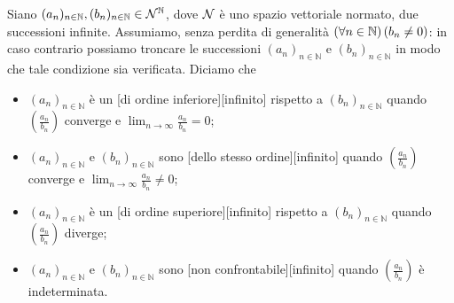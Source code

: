 \begin{Definition}
	Siano $(a_n)_{n \in \mathbb{N}}, (b_n)_{n \in \mathbb{N}} \in \mathcal{N}^\mathbb{N}$, dove $\mathcal{N}$ \`e uno spazio vettoriale normato, due successioni infinite. Assumiamo, senza perdita di generalit\`a $\left ( \forall n \in \mathbb{N} \right ) \left ( b_n \neq 0 \right )$: in caso contrario possiamo troncare le successioni $(a_n)_{n \in \mathbb{N}}$ e $(b_n)_{n \in \mathbb{N}}$ in modo che tale condizione sia verificata. Diciamo che 
	\begin{itemize}
		\item $(a_n)_{n \in \mathbb{N}}$ \`e un [di ordine inferiore][infinito] rispetto a $(b_n)_{n \in \mathbb{N}}$ quando $\left ( \frac{a_n}{b_n} \right )$ converge e $\lim_{n \rightarrow \infty} \frac{a_n}{b_n} = 0$;
		\item $(a_n)_{n \in \mathbb{N}}$ e $(b_n)_{n \in \mathbb{N}}$ sono [dello stesso ordine][infinito] quando $\left ( \frac{a_n}{b_n} \right )$ converge e $\lim_{n \rightarrow \infty} \frac{a_n}{b_n} \neq 0$;
		\item $(a_n)_{n \in \mathbb{N}}$ \`e un [di ordine superiore][infinito] rispetto a $(b_n)_{n \in \mathbb{N}}$ quando $\left ( \frac{a_n}{b_n} \right )$ diverge;
		\item $(a_n)_{n \in \mathbb{N}}$ e $(b_n)_{n \in \mathbb{N}}$ sono [non confrontabile][infinito] quando $\left ( \frac{a_n}{b_n} \right )$ \`e indeterminata.
	\end{itemize}
\end{Definition}
